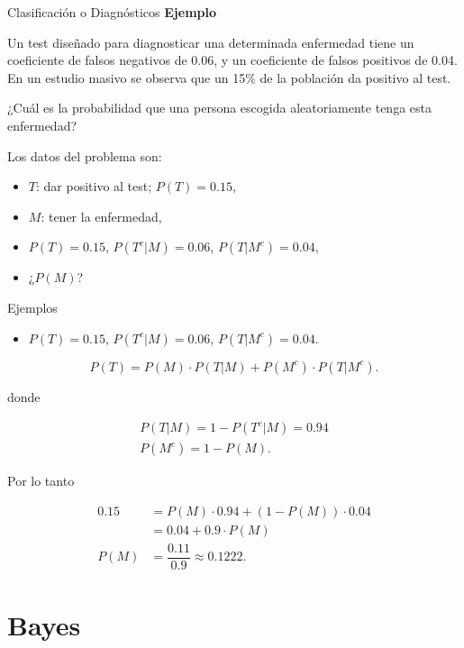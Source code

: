 \documentclass[
  ignorenonframetext,
  aspectratio=169]{beamer}
\providecommand{\tightlist}{%
  \setlength{\itemsep}{0pt}\setlength{\parskip}{0pt}}\usepackage{longtable,booktabs,array}
\begin{document}
\begin{frame}{Clasificación o Diagnósticos}
\label{clasificaciuxf3n-o-diagnuxf3sticos-6}
\textbf{Ejemplo}

Un test diseñado para diagnosticar una determinada enfermedad tiene un
coeficiente de falsos negativos de 0.06, y un coeficiente de falsos
positivos de 0.04. En un estudio masivo se observa que un 15\% de la
población da positivo al test.

¿Cuál es la probabilidad que una persona escogida aleatoriamente tenga
esta enfermedad?

Los datos del problema son:

\begin{itemize}
\tightlist
\item
  \(T\): dar positivo al test; \(P(T)=0.15\),
\item
  \(M\): tener la enfermedad,
\item
  \(P(T)=0.15\), \(P(T^c|M)=0.06\), \(P(T|M^c)=0.04\),
\item
  ¿\(P(M)\)?
\end{itemize}
\end{frame}

\begin{frame}{Ejemplos}
\label{ejemplos-4}
\begin{itemize}
\tightlist
\item
  \(P(T)=0.15\), \(P(T^c|M)=0.06\), \(P(T|M^c)=0.04.\)
\end{itemize}

\[
P(T) =P(M)\cdot P(T|M)+P(M^c)\cdot P(T|M^c).
\]

donde

\[
\begin{array}{l}
P(T|M)=1-P(T^c|M)=0.94 \\
P(M^c)=1-P(M).
\end{array}
\]

Por lo tanto

\[
\begin{array}{rl}
0.15 & = P(M)\cdot 0.94+(1-P(M))\cdot 0.04\\
 & =0.04+0.9\cdot P(M)\\
P(M) & =\dfrac{0.11}{0.9}\approx 0.1222.
\end{array}
\]
\end{frame}

\section{Bayes}\label{bayes}
\end{document}
